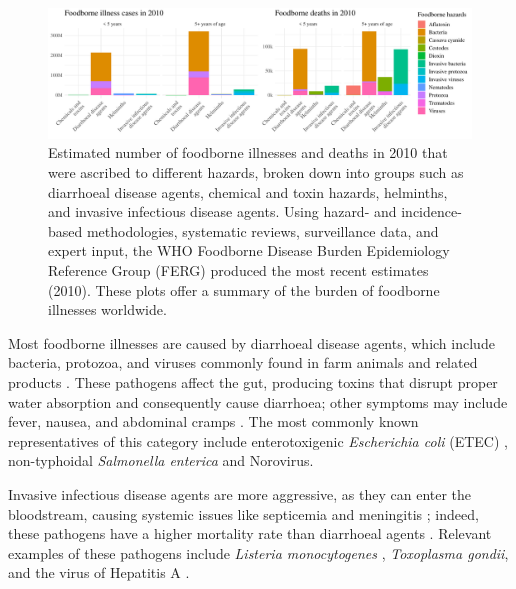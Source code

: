 \begin{figure}[tb]
    \centering
    \includegraphics[width = \textwidth]{./Figures/chapter1/foodborneIllness/foodborneIllnessDeaths.pdf}
    \caption{Estimated number of foodborne illnesses and deaths in 2010 that were ascribed to different hazards, broken down into groups such as diarrhoeal disease agents, chemical and toxin hazards, helminths, and invasive infectious disease agents. Using hazard- and incidence-based methodologies, systematic reviews, surveillance data, and expert input, the WHO Foodborne Disease Burden Epidemiology Reference Group (FERG) produced the most recent estimates (2010). These plots offer a summary of the burden of foodborne illnesses worldwide. \citep{whoFoodborne2010Illnesses,whoFoodborne2010Deaths,whoBurden2015}}
    \label{fig:foodborneIllnesses}
\end{figure}

Most foodborne illnesses are caused by diarrhoeal disease agents, which include bacteria, protozoa, and viruses commonly found in farm animals and related products \citep{leeEtiological2021}. These pathogens affect the gut, producing toxins that disrupt proper water absorption and consequently cause diarrhoea; other symptoms may include fever, nausea, and abdominal cramps \citep{mathanDiarrhoeal1998, leeEtiological2021}. The most commonly known representatives  of this category include enterotoxigenic \textit{Escherichia coli} (ETEC) \citep{zhangEnterotoxigenic2022}, non-typhoidal \textit{Salmonella enterica} \citep{ferrariWorldwide2019} and Norovirus.

Invasive infectious disease agents are more aggressive, as they can enter the bloodstream, causing systemic issues like septicemia and meningitis \citep{hodgesInfectious2010}; indeed, these pathogens have a higher mortality rate than diarrhoeal agents \citep{kirkWorld2015}. Relevant examples of these pathogens include \textit{Listeria monocytogenes} \citep{camargoListeria2017}, \textit{Toxoplasma gondii}, and the virus of Hepatitis A \citep{dicolaFoodborne2021}.

